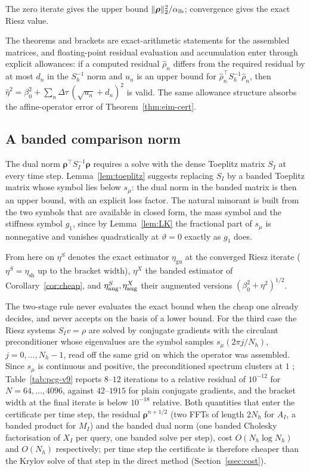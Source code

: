 \documentclass[hidelinks]{siamart251216}
\newcommand{\dt}{\Delta\tau}
\newcommand{\etaSharp}{\eta_{\mathrm{sh}}}
\newcommand{\etaGuar}{\eta_{\mathrm{gu}}}
\newcommand{\rr}{\bm\rho}
\newcommand{\sym}[1]{#1}                 %
\begin{document}
The zero iterate gives the upper bound $\|\rr\|_2^2/\alpha_{\rm lb}$; convergence gives the exact
Riesz value.
\begin{remark}
\label{rem:arithmetic-scope}
The theorems and brackets are exact-arithmetic statements for the assembled matrices, and
floating-point residual evaluation and accumulation enter through explicit allowances: if a
computed residual $\widehat\rho_n$ differs from the required residual by at
most $d_n$ in the $S_h^{-1}$ norm and $u_n$ is an upper bound for
$\widehat\rho_n^\top S_h^{-1}\widehat\rho_n$, then
$\widehat\eta^2=\beta_0^2+\sum_n\dt\,(\sqrt{u_n}+d_n)^2$ is valid.  The same allowance
structure absorbs the affine-operator error of Theorem~\ref{thm:eim-cert}.
\end{remark}
\subsection{A banded comparison norm}
\label{ssec:comparison}
The dual norm $\rr^\top S_I^{-1}\rr$ requires a solve with the dense Toeplitz matrix $S_I$ at
every time step.  Lemma~\ref{lem:toeplitz} suggests replacing $S_I$ by a banded Toeplitz matrix
whose symbol lies below $\sym{s}_\mu$: the dual norm in the banded matrix is then an upper bound,
with an explicit loss factor.  The natural minorant is built from the two symbols that are
available in closed form, the mass symbol and the stiffness symbol $\sym{g}_1$, since by
Lemma~\ref{lem:LK} the fractional part of $\sym{s}_\mu$ is nonnegative and vanishes
quadratically at $\vartheta=0$ exactly as $\sym{g}_1$ does.


From here on $\eta^S$ denotes the exact estimator $\etaGuar$ at the converged Riesz iterate
($\eta^S=\etaSharp$ up to the bracket width), $\eta^X$ the banded estimator of
Corollary~\ref{cor:cheap}, and $\eta^S_{\rm aug},\eta^X_{\rm aug}$ their augmented versions
$(\beta_0^2+\eta^2)^{1/2}$.

The two-stage rule never evaluates the exact bound when the cheap one already decides, and never
accepts on the basis of a lower bound.  For the third case the Riesz systems $S_Iv=\rho$ are
solved by conjugate gradients with the circulant preconditioner whose eigenvalues are the symbol
samples $\sym{s}_\mu(2\pi j/N_h)$, $j=0,\dots,N_h-1$, read off the same grid on which the operator
was assembled.  Since $\sym{s}_\mu$ is continuous and positive, the preconditioned spectrum
clusters at $1$ \cite{ChanStrang1989}; Table~\ref{tab:pcg-v9} reports $8$--$12$ iterations to a
relative residual of $10^{-12}$ for $N=64,\dots,4096$, against $42$--$1915$ for plain conjugate
gradients, and the bracket width at the final iterate is below $10^{-18}$ relative.  Both
quantities that enter the certificate per time step, the residual $\rr^{n+1/2}$ (two FFTs of
length $2N_h$ for $A_I$, a banded product for $M_I$) and the banded dual norm (one banded
Cholesky factorisation of $X_I$ per query, one banded solve per step), cost $O(N_h\log N_h)$ and
$O(N_h)$ respectively; per time step the certificate is therefore cheaper than the Krylov solve
of that step in the direct method (Section~\ref{ssec:cost}).
\end{document}
